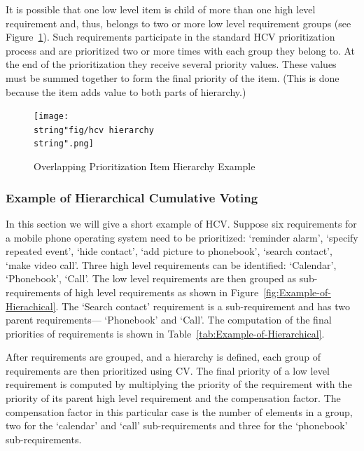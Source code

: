 It is possible that one low level item is child of more than one high
level requirement and, thus, belongs to two or more low level requirement
groups (see Figure~\ref{fig:Overlapping-Prioritization-Item}). Such
requirements participate in the standard HCV prioritization process and
are prioritized two or more times with each group they belong to.
At the end of the prioritization they receive several priority values.
These values must be summed together to form the final priority of the item.
(This is done because the item adds value to both parts of hierarchy.)


%
\begin{figure}
	\center
\texttt{[image: \\string"fig/hcv hierarchy\\string".png]}

\caption{\label{fig:Overlapping-Prioritization-Item}Overlapping Prioritization
Item Hierarchy Example}
%
\end{figure}



\subsubsection{Example of Hierarchical Cumulative Voting}

In this section we will give a short example of HCV. Suppose six requirements
for a mobile phone operating system need to be prioritized: `reminder
alarm', `specify repeated event', `hide contact', `add picture to phonebook',
`search contact', `make video call'. Three high level requirements can
be identified: `Calendar', `Phonebook', `Call'. The low level requirements are then
grouped as sub-requirements of high level requirements as shown in
Figure~\ref{fig:Example-of-Hierachical}. The `Search contact' requirement is a 
sub-requirement and has two parent requirements--- `Phonebook'
and `Call'. The computation of the final priorities of requirements is shown
in Table~\ref{tab:Example-of-Hierarchical}.

After requirements are grouped, and a hierarchy is defined, each group
of requirements are then prioritized using CV. The final priority of a low level
requirement is computed by multiplying the priority of the requirement
with the priority of its parent high level requirement and the compensation
factor. The compensation factor in this particular case is the number of elements
in a group, two for the `calendar' and `call' sub-requirements and three for
the `phonebook' sub-requirements.

